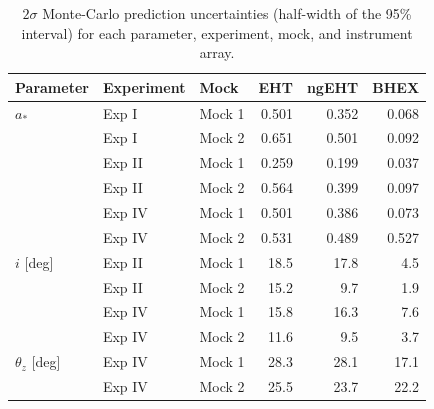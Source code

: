 \begin{table}[t]
\centering
\caption{$2\sigma$ Monte-Carlo prediction uncertainties (half-width of the 95\% interval) for each parameter, experiment, mock, and instrument array.}
\label{tab:mocks_tier_grid_3x3_absolute_2sigma}
\begin{tabular}{lllrrr}
\toprule
Parameter & Experiment & Mock & EHT & ngEHT & BHEX \\
\midrule
$a_{\ast}$ & Exp I & Mock 1 & 0.501 & 0.352 & 0.068 \\
 & Exp I & Mock 2 & 0.651 & 0.501 & 0.092 \\
 & Exp II & Mock 1 & 0.259 & 0.199 & 0.037 \\
 & Exp II & Mock 2 & 0.564 & 0.399 & 0.097 \\
 & Exp IV & Mock 1 & 0.501 & 0.386 & 0.073 \\
 & Exp IV & Mock 2 & 0.531 & 0.489 & 0.527 \\
\midrule
$i$ [deg] & Exp II & Mock 1 & 18.5 & 17.8 & 4.5 \\
 & Exp II & Mock 2 & 15.2 & 9.7 & 1.9 \\
 & Exp IV & Mock 1 & 15.8 & 16.3 & 7.6 \\
 & Exp IV & Mock 2 & 11.6 & 9.5 & 3.7 \\
\midrule
$\theta_{z}$ [deg] & Exp IV & Mock 1 & 28.3 & 28.1 & 17.1 \\
 & Exp IV & Mock 2 & 25.5 & 23.7 & 22.2 \\
\bottomrule
\end{tabular}
\end{table}
